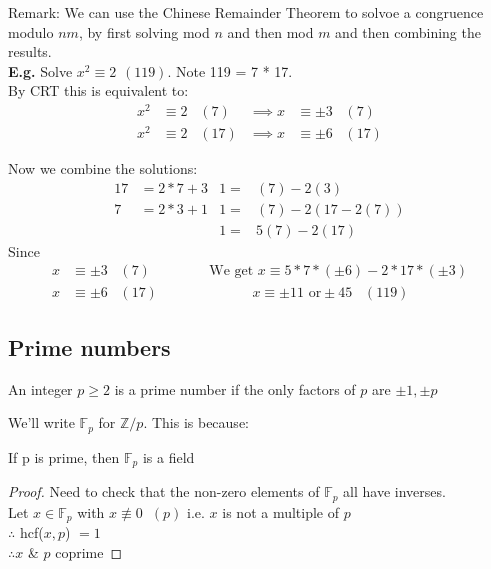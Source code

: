 \documentclass[11pt]{article}
\begin{document}
Remark: We can use the Chinese Remainder Theorem to solvoe a congruence modulo $nm$, by first solving mod $n$ and then mod $m$ and then combining the results.\\
\textbf{E.g.} Solve $x^{2} \equiv 2 \hspace{5pt} (119)$. Note 119 = 7 * 17.\\
By CRT this is equivalent to:
\begin{align*}
	x^{2} & \equiv 2 \hspace{10pt}(7)  & \implies  x&\equiv \pm3 \hspace{10pt} (7)\\
	x^{2} & \equiv 2 \hspace{10pt} (17) & \implies x&\equiv \pm6 \hspace{10pt} (17)
\end{align*}

Now we combine the solutions:
\begin{align*}
	17 & = 2*7+3  &1=&(7) - 2(3)\\
	7 &= 2*3+1   &1 =&(7) - 2(17-2(7))\\
	& &  1=&5(7) -2(17)
\end{align*}
Since 
\begin{align*}
	x &\equiv \pm 3\hspace{10pt}(7)  \hspace{50pt}\text{We get } x \equiv 5*7*(\pm 6) - 2*17*(\pm 3) \\
	x &\equiv \pm 6 \hspace{10pt} (17) \hspace{81pt} x \equiv \pm 11 \text{  or} \pm 45 \hspace{10pt} (119) 
\end{align*}

\subsection{Prime numbers}

\begin{definition}
An integer $p\geq 2 $ is a prime number if the only factors of $p$ are $\pm 1, \pm p$
\end{definition}

We'll write $\mathbb{F}_p$ for $\mathbb{Z}/p$. This is because:
\begin{theorem}
	If p is prime, then $\mathbb{F}_p$ is a field 
\end{theorem}

\begin{proof}
	Need to check that the non-zero elements of $\mathbb{F}_p$ all have inverses.\\
	
	Let $x \in \mathbb{F}_p$ with $x \not \equiv 0 \hspace{7pt}(p)$ i.e. $x$ is not a multiple of $p$\\
	
	$\therefore$ hcf($x,p$) $=1$\\
	
	$\therefore x$ \& $p$ coprime
\end{proof}
\end{document}

